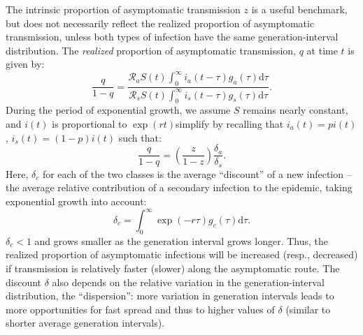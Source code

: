 The intrinsic proportion of asymptomatic transmission $z$ is a useful benchmark, but does not necessarily reflect the realized proportion of asymptomatic transmission, unless both types of infection have the same generation-interval distribution.
The \emph{realized} proportion of asymptomatic transmission, $q$ at time $t$ is given by:
\begin{equation}
\frac{q}{1-q}=\frac{\mathcal R_a S(t) \int_0^\infty i_a(t-\tau) g_a(\tau) \mathrm{d}\tau}{\mathcal R_s S(t) \int_0^\infty i_s(t-\tau) g_s(\tau) \mathrm{d}\tau}.
\end{equation}
During the period of exponential growth, we assume $S$ remains nearly constant, and $i(t)$ is proportional to $\exp(r t)$\DIFdelbegin {}\DIFdelend \DIFaddbegin {}\DIFaddend simplify by recalling that $i_a(t)= p i(t)$, $i_s(t)=(1-p)i(t)$ such that: 
\begin{equation}
\frac{q}{1-q}=\left(\frac{z}{1-z}\right)\frac{\delta_a}{\delta_s}.
\label{eq.qratio}
\end{equation}
Here, $\delta_c$ for each of the two classes is the average ``discount'' of a new infection -- the average relative contribution of a secondary infection to the epidemic, taking exponential growth into account:
\begin{equation}
	\delta_c = \int_0^\infty \exp(-r\tau) g_c(\tau) \mathrm{d}\tau.
\end{equation}
$\delta_c<1$ and grows smaller as the generation interval grows longer.
Thus, the realized proportion of asymptomatic infections will be increased (resp., decreased) if transmission is relatively faster (slower) along the asymptomatic route.
The discount $\delta$ also depends on the relative variation in the generation-interval distribution, the ``dispersion'': more variation in generation intervals leads to more opportunities for fast spread and thus to higher values of $\delta$ (similar to shorter average generation intervals). 

